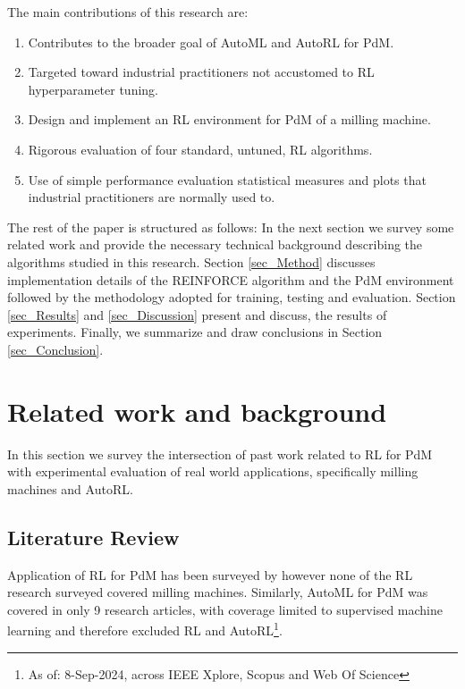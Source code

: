 \documentclass[referee, sn-mathphys-num]{sn-jnl}
\begin{document}
	The main contributions of this research are:
	\begin{enumerate}
		\item Contributes to the broader goal of AutoML and AutoRL for PdM.
		\item Targeted toward industrial practitioners not accustomed to RL hyperparameter tuning.
		\item Design and implement an RL environment for PdM of a milling machine.
		\item Rigorous evaluation of four standard, untuned, RL algorithms.
		\item Use of simple performance evaluation statistical measures and plots that industrial practitioners are normally used to.
	\end{enumerate} 
	
	The rest of the paper is structured as follows: In the next section we survey some related work and provide the necessary technical background describing the algorithms studied in this research. Section \ref{sec_Method} discusses implementation details of the REINFORCE algorithm and the PdM environment followed by the methodology adopted for training, testing and evaluation. Section \ref{sec_Results} and \ref{sec_Discussion} present and discuss, the results of experiments. Finally, we summarize and draw conclusions in Section \ref{sec_Conclusion}.
	
	\section{Related work and background}\label{sec_SLR}
	In this section we survey the intersection of past work related to RL for PdM with experimental evaluation of real world applications, specifically milling machines and AutoRL.
	
	\subsection{Literature Review}
	Application of RL for PdM has been surveyed by \cite{Panzer2021, Erhan2021, siraskar2023} however none of the RL research surveyed covered milling machines. Similarly, AutoML for PdM was covered in only 9 research articles, with coverage limited to supervised machine learning and therefore excluded RL and AutoRL\footnote{As of: 8-Sep-2024, across IEEE Xplore\texttrademark{}, Scopus\texttrademark{} and Web Of Science\texttrademark{}}.
	
\end{document}

